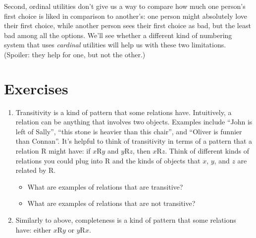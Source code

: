 \documentclass[]{tufte-book}
\providecommand{\tightlist}{%
  \setlength{\itemsep}{0pt}\setlength{\parskip}{0pt}}
\begin{document}
Second, ordinal utilities don't give us a way to compare how much one person's first choice is liked in comparison to another's: one person might absolutely love their first choice, while another person sees their first choice as bad, but the least bad among all the options. We'll see whether a different kind of numbering system that uses \emph{cardinal} utilities will help us with these two limitations. (Spoiler: they help for one, but not the other.)

\hypertarget{exercises-2}{%
\section*{Exercises}\label{exercises-2}}

\begin{enumerate}
\def\labelenumi{\arabic{enumi}.}
\item
  Transitivity is a kind of pattern that some relations have. Intuitively, a relation can be anything that involves two objects. Examples include ``John is left of Sally'', ``this stone is heavier than this chair'', and ``Oliver is funnier than Connan''. It's helpful to think of transitivity in terms of a pattern that a relation R might have: if \(x\)R\(y\) and \(y\)R\(z\), then \(x\)R\(z\). Think of different kinds of relations you could plug into R and the kinds of objects that \(x\), \(y\), and \(z\) are related by R.

  \begin{itemize}
  \tightlist
  \item
    What are examples of relations that are transitive?
  \item
    What are examples of relations that are not transitive?
  \end{itemize}
\item
  Similarly to above, completeness is a kind of pattern that some relations have: either \(x\)R\(y\) or \(y\)R\(x\).


\end{enumerate}
\end{document}
